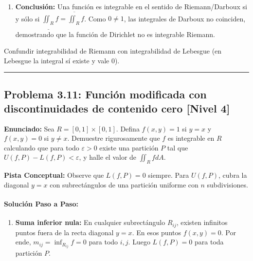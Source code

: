 \documentclass[11pt,a4paper]{article}
\begin{document}
\begin{enumerate}[label=\textbf{\arabic*.}]
\item \textbf{Conclusión:}
Una función es integrable en el sentido de Riemann/Darboux si y sólo si $\underline{\iint_R} f = \overline{\iint_R} f$.
Como $0 \neq 1$, las integrales de Darboux no coinciden, demostrando que la función de Dirichlet no es integrable Riemann.
\end{enumerate}

\begin{trapbox}
Confundir integrabilidad de Riemann con integrabilidad de Lebesgue (en Lebesgue la integral sí existe y vale 0).
\end{trapbox}

\vspace{0.5cm}
\hrule
\vspace{0.5cm}

\subsection*{Problema 3.11: Función modificada con discontinuidades de contenido cero \hfill \color{primaryblue}\small[Nivel 4]}

\begin{tcolorbox}[colback=white,colframe=gray!40,arc=1mm,boxrule=0.5pt,left=3mm,right=3mm,top=2mm,bottom=2mm]
\textbf{Enunciado:} Sea $R = [0, 1] \times [0, 1]$. Defina $f(x,y) = 1$ si $y = x$ y $f(x,y) = 0$ si $y \neq x$. Demuestre rigurosamente que $f$ es integrable en $R$ calculando que para todo $\varepsilon > 0$ existe una partición $P$ tal que $U(f, P) - L(f, P) < \varepsilon$, y halle el valor de $\iint_R f dA$.
\end{tcolorbox}

\begin{tcolorbox}[colback=yellow!4,colframe=accentamber!70,arc=1mm,boxrule=0.5pt,left=3mm,right=3mm,top=1.5mm,bottom=1.5mm]
\textbf{Pista Conceptual:} Observe que $L(f,P) = 0$ siempre. Para $U(f,P)$, cubra la diagonal $y=x$ con subrectángulos de una partición uniforme con $n$ subdivisiones.
\end{tcolorbox}

\paragraph{Solución Paso a Paso:}\par
\begin{enumerate}[label=\textbf{\arabic*.}]
\item \textbf{Suma inferior nula:}
En cualquier subrectángulo $R_{ij}$, existen infinitos puntos fuera de la recta diagonal $y = x$. En esos puntos $f(x,y) = 0$.
Por ende, $m_{ij} = \inf_{R_{ij}} f = 0$ para todo $i,j$.
Luego $L(f, P) = 0$ para toda partición $P$.
\end{enumerate}
\end{document}
